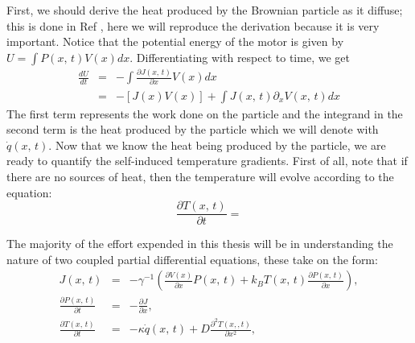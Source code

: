 First, we should derive the heat produced by the Brownian particle as it diffuse; this is done in Ref \cite{M.W.Jack2016}, here we will reproduce the derivation because it is very important. Notice that the potential energy of the motor is given by $U = \int P(x, \, t) V(x) dx$. Differentiating with respect to time, we get
\begin{eqnarray}
\frac{d U}{d t} &=& -\int \frac{\partial J(x, \, t)}{\partial x} V(x) dx \\
		        &=& -[J(x) V(x)] + \int J(x, \, t) \partial_x V(x, \, t) dx
\end{eqnarray}
The first term represents the work done on the particle and the integrand in the second term is the heat produced by the particle which we will denote with $\dot{q}(x, \, t)$. Now that we know the heat being produced by the particle, we are ready to quantify the self-induced temperature gradients. First of all, note that if there are no sources of heat, then the temperature will evolve according to the equation:
\begin{equation}
\frac{\partial T(x, \, t)}{\partial t} = 
\end{equation} 


The majority of the effort expended in this thesis will be in understanding the nature of two coupled partial differential equations, these take on the form:
\begin{eqnarray}
J(x, \, t) &=& -\gamma^{-1} \left ( \frac{\partial V(x)}{\partial x} P(x, \, t) + k_B T(x, \, t) \frac{\partial P(x, \, t)}{\partial x} \right ), \label{eqn:current} \\
\frac{\partial P(x, \, t)}{\partial t} &=& -\frac{\partial J}{\partial x}, \label{eqn:Smoluchowski} \\
\frac{\partial T(x, \, t)}{\partial t} &=& -\kappa \dot{q}(x, \, t) + D \frac{\partial^2 T(x, 
, t)}{\partial x^2}, \label{eqn:TemperatureEvolution}
\end{eqnarray}

